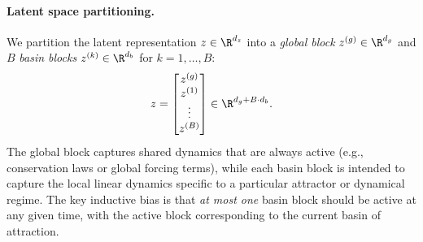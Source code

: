 \paragraph{Latent space partitioning.}
We partition the latent representation $z \in \R^{d_z}$ into a \emph{global block} $z^{(g)} \in \R^{d_g}$ and $B$ \emph{basin blocks} $z^{(k)} \in \R^{d_b}$ for $k = 1, \ldots, B$:
\begin{equation}
    z = \begin{bmatrix} z^{(g)} \\ z^{(1)} \\ \vdots \\ z^{(B)} \end{bmatrix} \in \R^{d_g + B \cdot d_b}.
\end{equation}
The global block captures shared dynamics that are always active (e.g., conservation laws or global forcing terms), while each basin block is intended to capture the local linear dynamics specific to a particular attractor or dynamical regime. The key inductive bias is that \emph{at most one} basin block should be active at any given time, with the active block corresponding to the current basin of attraction.

